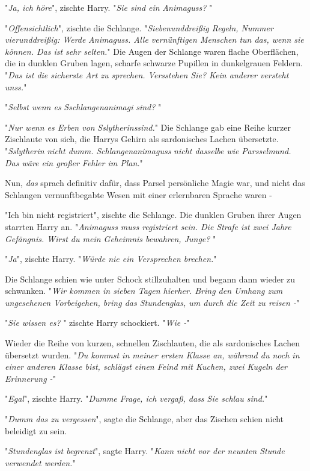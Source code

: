 {"\emph{Ja, ich höre}", zischte Harry. "\emph{Sie sind ein} \emph{Animaguss?} "

"\emph{Offensichtlich}", zischte die Schlange. "\emph{Siebenunddreißig Regeln, Nummer vierunddreißig: Werde} \emph{Animaguss. Alle vernünftigen Menschen tun das, wenn sie können. Das ist sehr selten.}" Die Augen der Schlange waren flache Oberflächen, die in dunklen Gruben lagen, scharfe schwarze Pupillen in dunkelgrauen Feldern. "\emph{Das ist die sicherste Art zu sprechen. Versstehen Sie? Kein anderer versteht} \emph{unss.}"

"\emph{Selbst wenn es} \emph{Sschlangenanimagi} \emph{sind?} "

"\emph{Nur wenn es Erben von} \emph{Sslytherinssind.}" Die Schlange gab eine Reihe kurzer Zischlaute von sich, die Harrys Gehirn als sardonisches Lachen übersetzte. "\emph{Sslytherin} \emph{nicht dumm.} \emph{Schlangenanimaguss} \emph{nicht dasselbe wie} \emph{Parsselmund. Das wäre ein großer Fehler im Plan.}"

Nun, \emph{das} sprach definitiv dafür, dass Parsel persönliche Magie war, und nicht das Schlangen vernunftbegabte Wesen mit einer erlernbaren Sprache waren -

"Ich bin nicht registriert", zischte die Schlange. Die dunklen Gruben ihrer Augen starrten Harry an. "\emph{Animaguss} \emph{muss registriert sein. Die Strafe ist zwei Jahre Gefängnis. Wirst du mein Geheimnis bewahren, Junge?} "

"\emph{Ja}", zischte Harry. "\emph{Würde nie ein Versprechen brechen.}"

Die Schlange schien wie unter Schock stillzuhalten und begann dann wieder zu schwanken. "\emph{Wir kommen in sieben Tagen hierher. Bring den Umhang zum ungesehenen Vorbeigehen, bring das Stundenglas, um durch die Zeit zu reisen -}"

"\emph{Sie wissen es?} " zischte Harry schockiert. "\emph{Wie -}"

Wieder die Reihe von kurzen, schnellen Zischlauten, die als sardonisches Lachen übersetzt wurden. "\emph{Du kommst in meiner ersten Klasse an, während du noch in einer anderen Klasse bist, schlägst einen Feind mit Kuchen, zwei Kugeln der Erinnerung -}"

"\emph{Egal}", zischte Harry. "\emph{Dumme Frage, ich vergaß, dass Sie schlau sind.}"

"\emph{Dumm das zu vergessen}", sagte die Schlange, aber das Zischen schien nicht beleidigt zu sein.

"\emph{Stundenglas ist begrenzt}", sagte Harry. "\emph{Kann nicht vor der neunten Stunde verwendet werden.}"

}
